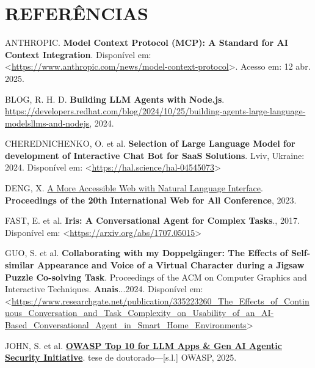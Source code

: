 \documentclass[
]{article}
\newlength{\cslhangindent}
\newenvironment{CSLReferences}[2] %
 {\begin{list}{}{%
  \setlength{\itemindent}{0pt}
  \setlength{\leftmargin}{0pt}
  \setlength{\parsep}{0pt}
  \ifodd #1
   \setlength{\leftmargin}{\cslhangindent}
   \setlength{\itemindent}{-1\cslhangindent}
  \fi
  \setlength{\itemsep}{#2\baselineskip}}}
 {\end{list}}
\begin{document}
\section*{REFERÊNCIAS}\label{referuxeancias}

\label{refs}
\begin{CSLReferences}{0}{1}
ANTHROPIC. \textbf{Model Context Protocol (MCP): A Standard for AI
Context Integration}. Disponível em:
\textless{}\url{https://www.anthropic.com/news/model-context-protocol}\textgreater.
Acesso em: 12 abr. 2025.

BLOG, R. H. D. \textbf{Building LLM Agents with Node.js}.
\url{https://developers.redhat.com/blog/2024/10/25/building-agents-large-language-modelsllms-and-nodejs},
2024.

CHEREDNICHENKO, O. et al. \textbf{Selection of Large Language Model for
development of Interactive Chat Bot for SaaS Solutions}. Lviv, Ukraine:
2024. Disponível em:
\textless{}\url{https://hal.science/hal-04545073}\textgreater{}

DENG, X. \href{https://api.semanticscholar.org/CorpusID:258259387}{A
More Accessible Web with Natural Language Interface}.
\textbf{Proceedings of the 20th International Web for All Conference},
2023.

FAST, E. et al. \textbf{Iris: A Conversational Agent for Complex
Tasks}., 2017. Disponível em:
\textless{}\url{https://arxiv.org/abs/1707.05015}\textgreater{}

GUO, S. et al. \textbf{Collaborating with my Doppelgänger: The Effects
of Self-similar Appearance and Voice of a Virtual Character during a
Jigsaw Puzzle Co-solving Task}. Proceedings of the ACM on Computer
Graphics and Interactive Techniques. \textbf{Anais}...2024. Disponível
em:
\textless{}\url{https://www.researchgate.net/publication/335223260_The_Effects_of_Continuous_Conversation_and_Task_Complexity_on_Usability_of_an_AI-Based_Conversational_Agent_in_Smart_Home_Environments}\textgreater{}

JOHN, S. et al.
\textbf{\href{https://genai.owasp.org/llmrisk/llm01-prompt-injection}{OWASP
Top 10 for LLM Apps \& Gen AI Agentic Security Initiative}}. tese de
doutorado---{[}s.l.{]} OWASP, 2025.


\end{CSLReferences}
\end{document}
